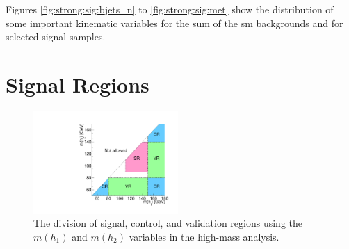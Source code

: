 Figures \ref{fig:strong:sig:bjets_n} to \ref{fig:strong:sig:met} show the distribution of some important kinematic variables for 
the sum of the \gls{sm} backgrounds and for selected signal samples. 


\section{Signal Regions}

\begin{figure}[htbp]
	\centering
	\includegraphics[width=0.490\textwidth]{figures/ewk_prod/varie/schema-1}
	\caption{The division of signal, control, and validation regions using the $m(h_1)$ and $m(h_2)$ variables in the high-mass analysis.}
	\label{fig:binning_crvr}
\end{figure}

\begin{table}[h]
\caption{Signal region definitions for the high-mass analysis. The units of \met, \mtb, $m(h_1)$, $m(h_2)$, and \meffb are GeV. These variables are defined in Section~\ref{high_event_selection}.}
\begin{center}

\label{tab:SR}
\end{center}
\end{table}


